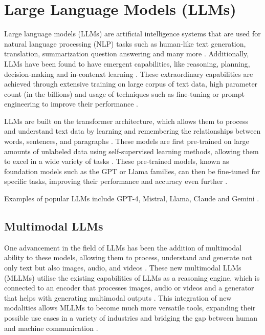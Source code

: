 \section{Large Language Models (LLMs)}

Large language models (LLMs) are artificial intelligence systems that are used for natural language processing (NLP) tasks such as human-like text generation, translation, summarization question answering and many more \parencite{llm2,llm_healthcare}. Additionally, LLMs have been found to have emergent capabilities, like reasoning, planning, decision-making and in-contenxt learning \parencite{llm2}. These extraordinary capabilities are achieved through extensive training on large corpus of text data, high parameter count (in the billions) and usage of techniques such as fine-tuning or prompt engineering to improve their performance \parencite{llm2,llm_healthcare}.

LLMs are built on the transformer architecture, which allows them to process and understand text data by learning and remembering the relationships between words, sentences, and paragraphs \parencite{llm}. These models are first pre-trained on large amounts of unlabeled data using self-supervised learning methods, allowing them to excel in a wide variety of tasks \parencite{foundation, llm2}. These pre-trained models, known as foundation models such as the GPT or Llama families, can then be fine-tuned for specific tasks, improving their performance and accuracy even further \parencite{gpt3,llama3,llm2}.

Examples of popular LLMs include GPT-4, Mistral, Llama, Claude and Gemini \parencite{gpt4,mistral,llama3,claude,gemini}.

\subsection{Multimodal LLMs}

One advancement in the field of LLMs has been the addition of multimodal ability to these models, allowing them to process, understand and generate not only text but also images, audio, and videos \parencite{mllm, mllm2}. These new multimodal LLMs (MLLMs) utilise the existing capabilities of LLMs as a reasoning engine, which is connected to an encoder that processes images, audio or videos and a generator that helps with generating multimodal outputs \parencite{mllm}. This integration of new modalities allows MLLMs to become much more versatile tools, expanding their possible use cases in a variety of industries and bridging the gap between human and machine communication \parencite{llm_healthcare}.

